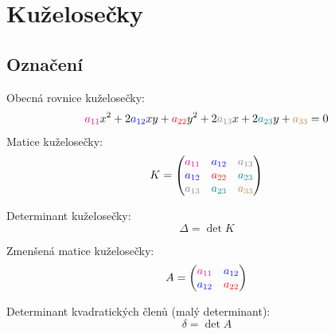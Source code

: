 
\section{Kuželosečky}\label{appb}
\subsection*{Označení}
Obecná rovnice kuželosečky:
$$
    \textcolor{magenta}{a_{11}}x^2 + 2 \textcolor{blue}{a_{12}}xy +
    \textcolor{red}{a_{22}}y^2 + 2 \textcolor{gray}{a_{13}}x +
    2 \textcolor{teal}{a_{23}}y + \textcolor{brown}{a_{33}}=0
$$
Matice kuželosečky:
$$
K=\begin{pmatrix}
    \textcolor{magenta}{a_{11}} & \textcolor{blue}{a_{12}} & \textcolor{gray}{a_{13}}\\
    \textcolor{blue}{a_{12}} & \textcolor{red}{a_{22}} & \textcolor{teal}{a_{23}} \\
    \textcolor{gray}{a_{13}} & \textcolor{teal}{a_{23}} &  \textcolor{brown}{a_{33}}
\end{pmatrix}
$$

Determinant kuželosečky:
$$
    \Delta = \det K
$$

Zmenšená matice kuželosečky:
$$
A = \begin{pmatrix}
	\textcolor{magenta}{a_{11}} & \textcolor{blue}{a_{12}}\\
	\textcolor{blue}{a_{12}} & \textcolor{red}{a_{22}}
\end{pmatrix}
$$

Determinant kvadratických členů (malý determinant):
$$
    \delta = \det A
$$

